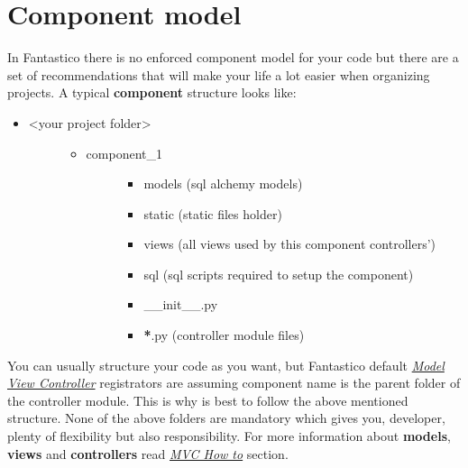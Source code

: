 \documentclass[letterpaper,10pt,english]{sphinxmanual}
\begin{document}
\section{Component model}
\label{features/component_model::doc}\label{features/component_model:component-model}
In Fantastico there is no enforced component model for your code but there are a set of recommendations
that will make your life a lot easier when organizing projects. A typical \textbf{component} structure looks like:
\begin{itemize}
\item {} \begin{description}
\item[{\textless{}your project folder\textgreater{}}] \leavevmode\begin{itemize}
\item {} \begin{description}
\item[{component\_1}] \leavevmode\begin{itemize}
\item {} 
models (sql alchemy models)

\item {} 
static (static files holder)

\item {} 
views (all views used by this component controllers')

\item {} 
sql (sql scripts required to setup the component)

\item {} 
\_\_init\_\_.py

\item {} 
{\color{red}\bfseries{}*}.py (controller module files)

\end{itemize}

\end{description}

\end{itemize}

\end{description}

\end{itemize}

You can usually structure your code as you want, but Fantastico default {\hyperref[features/mvc::doc]{\emph{Model View Controller}}} registrators are assuming
component name is the parent folder of the controller module. This is why is best to follow the above mentioned structure.
None of the above folders are mandatory which gives you, developer, plenty of flexibility but also responsibility. For
more information about \textbf{models}, \textbf{views} and \textbf{controllers} read {\hyperref[how_to/mvc_how_to::doc]{\emph{MVC How to}}} section.
\end{document}
